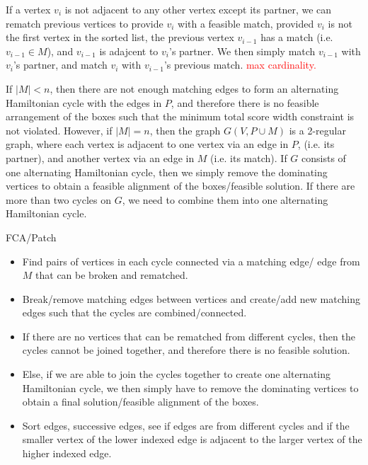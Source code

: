 \documentclass[oribibl]{llncs}
\begin{document}
If a vertex $v_i$ is not adjacent to any other vertex except its partner, we can rematch previous vertices to provide $v_i$ with a feasible match, provided $v_i$ is not the first vertex in the sorted list, the previous vertex $v_{i-1}$ has a match (i.e. $v_{i-1} \in M$), and $v_{i-1}$ is adajcent to $v_i$'s partner. We then simply match $v_{i-1}$ with $v_i$'s partner, and match $v_i$ with $v_{i-1}$'s previous match. \textcolor{red}{max cardinality.}

If $|M| < n$, then there are not enough matching edges to form an alternating Hamiltonian cycle with the edges in $P$, and therefore there is no feasible arrangement of the boxes such that the minimum total score width constraint is not violated. However, if $|M| = n$, then the graph $G(V, P \cup M)$ is a 2-regular graph, where each vertex is adjacent to one vertex via an edge in $P$, (i.e. its partner), and another vertex via an edge in $M$ (i.e. its match). If $G$ consists of one alternating Hamiltonian cycle, then we simply remove the dominating vertices to obtain a feasible alignment of the boxes/feasible solution. If there are more than two cycles on $G$, we need to combine them into one alternating Hamiltonian cycle.


FCA/Patch
\begin{itemize}
	\item Find pairs of vertices in each cycle connected via a matching edge/ edge from $M$ that can be broken and rematched.
	\item Break/remove matching edges between vertices and create/add new matching edges such that the cycles are combined/connected.
	\item If there are no vertices that can be rematched from different cycles, then the cycles cannot be joined together, and therefore there is no feasible solution.
	\item Else, if we are able to join the cycles together to create one alternating Hamiltonian cycle, we then simply have to remove the dominating vertices to obtain a final solution/feasible alignment of the boxes.
	\item Sort edges, successive edges, see if edges are from different cycles and if the smaller vertex of the lower indexed edge is adjacent to the larger vertex of the higher indexed edge.
\end{itemize}
\end{document}
